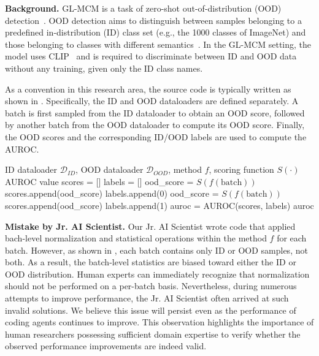 \textbf{Background.}
GL-MCM is a task of zero-shot out-of-distribution (OOD) detection~\citep{miyai2024generalized}.
OOD detection aims to distinguish between samples belonging to a predefined in-distribution (ID) class set (e.g., the 1000 classes of ImageNet) and those belonging to classes with different semantics~\citep{yang2024generalized}.
In the GL-MCM setting, the model uses CLIP~\citep{radford2021learning} and is required to discriminate between ID and OOD data without any training, given only the ID class names.

As a convention in this research area, the source code is typically written as shown in .
Specifically, the ID and OOD dataloaders are defined separately.
A batch is first sampled from the ID dataloader to obtain an OOD score, followed by another batch from the OOD dataloader to compute its OOD score.
Finally, the OOD scores and the corresponding ID/OOD labels are used to compute the AUROC.

\begin{algorithm}[t]
\caption{GL-MCM implementation (Python-like pseudocode).}
\begin{algorithmic}[1]
\Require ID dataloader $\mathcal{D}_{ID}$, OOD dataloader $\mathcal{D}_{OOD}$, method $f$, scoring function $S(\cdot)$
\Ensure AUROC value
\State scores = []
\State labels = []
  \State ood\_score = $S(f(\text{batch}))$
  \State scores.append(ood\_score)
  \State labels.append(0) 
\EndFor
{}
  \State ood\_score = $S(f(\text{batch}))$
  \State scores.append(ood\_score)
  \State labels.append(1) 
\EndFor
\State auroc = AUROC(scores, labels)
\State \Return auroc
\end{algorithmic}
\label{code:glmcm}
\end{algorithm}


\textbf{Mistake by Jr. AI Scientist.}
Our Jr. AI Scientist wrote code that applied bach-level normalization and statistical operations within the method $f$ for each batch.
However, as shown in , each batch contains only ID or OOD samples, not both. As a result, the batch-level statistics are biased toward either the ID or OOD distribution.
Human experts can immediately recognize that normalization should not be performed on a per-batch basis.
Nevertheless, during numerous attempts to improve performance, the Jr. AI Scientist often arrived at such invalid solutions.
We believe this issue will persist even as the performance of coding agents continues to improve.
This observation highlights the importance of human researchers possessing sufficient domain expertise to verify whether the observed performance improvements are indeed valid.

